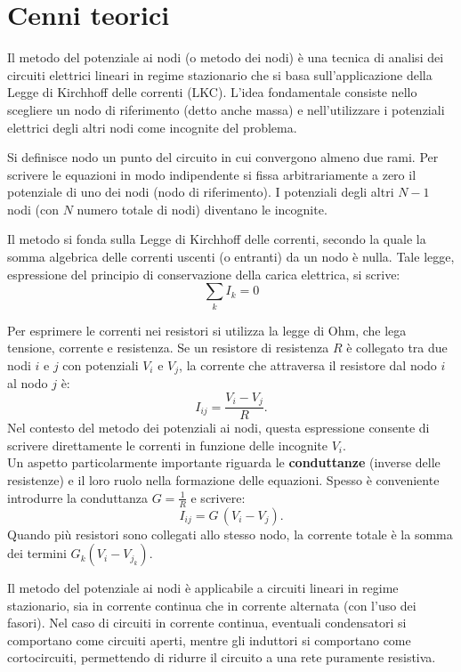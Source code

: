 \section{Cenni teorici}
Il metodo del potenziale ai nodi (o metodo dei nodi) è una tecnica di analisi dei circuiti elettrici lineari in regime stazionario che si basa sull’applicazione della Legge di Kirchhoff delle correnti (LKC). L’idea fondamentale consiste nello scegliere un nodo di riferimento (detto anche massa) e nell’utilizzare i potenziali elettrici degli altri nodi come incognite del problema.

Si definisce nodo un punto del circuito in cui convergono almeno due rami. Per scrivere le equazioni in modo indipendente si fissa arbitrariamente a zero il potenziale di uno dei nodi (nodo di riferimento). I potenziali degli altri \(N-1\) nodi (con \(N\) numero totale di nodi) diventano le incognite.

Il metodo si fonda sulla Legge di Kirchhoff delle correnti, secondo la quale la somma algebrica delle correnti uscenti (o entranti) da un nodo è nulla. Tale legge, espressione del principio di conservazione della carica elettrica, si scrive:
\begin{equation}
    \sum_{k} I_k = 0
\end{equation}

Per esprimere le correnti nei resistori si utilizza la legge di Ohm, che lega tensione, corrente e resistenza. Se un resistore di resistenza \(R\) è collegato tra due nodi \(i\) e \(j\) con potenziali \(V_i\) e \(V_j\), la corrente che attraversa il resistore dal nodo \(i\) al nodo \(j\) è:
\begin{equation}
    I_{ij} = \frac{V_i - V_j}{R}.
\end{equation}
Nel contesto del metodo dei potenziali ai nodi, questa espressione consente di scrivere direttamente le correnti in funzione delle incognite \(V_i\).\\

Un aspetto particolarmente importante riguarda le \textbf{conduttanze} (inverse delle resistenze) e il loro ruolo nella formazione delle equazioni. Spesso è conveniente introdurre la conduttanza \(G = \frac{1}{R}\) e scrivere:
\begin{equation}
    I_{ij} = G\,(V_i - V_j).
\end{equation}
Quando più resistori sono collegati allo stesso nodo, la corrente totale è la somma dei termini \(G_k (V_i - V_{j_k})\).

Il metodo del potenziale ai nodi è applicabile a circuiti lineari in regime stazionario, sia in corrente continua che in corrente alternata (con l’uso dei fasori). Nel caso di circuiti in corrente continua, eventuali condensatori si comportano come circuiti aperti, mentre gli induttori si comportano come cortocircuiti, permettendo di ridurre il circuito a una rete puramente resistiva.


